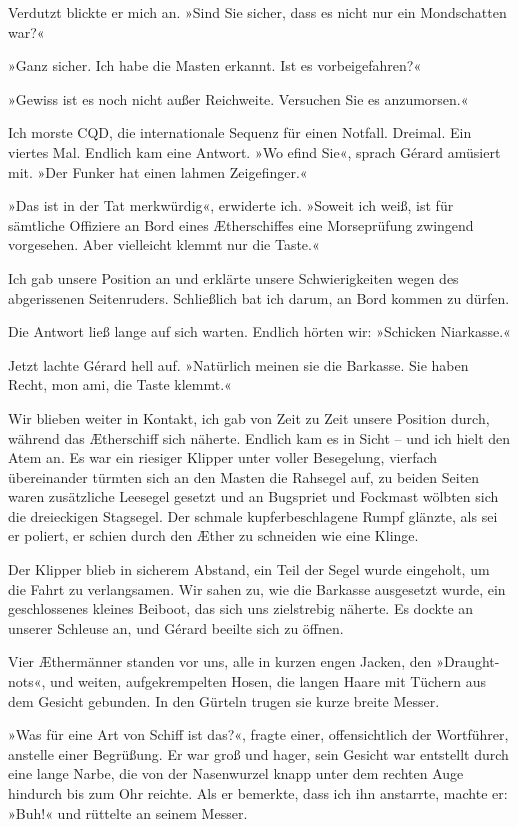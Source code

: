 Verdutzt blickte er mich an. »Sind Sie sicher, dass es nicht nur
ein Mondschatten war?«

»Ganz sicher. Ich habe die Masten erkannt. Ist es vorbeigefahren?«

»Gewiss ist es noch nicht außer Reichweite. Versuchen Sie es
anzumorsen.«

Ich morste CQD, die internationale Sequenz für einen Notfall.
Dreimal. Ein viertes Mal. Endlich kam eine Antwort. »Wo efind Sie«,
sprach Gérard amüsiert mit. »Der Funker hat einen lahmen
Zeigefinger.«

»Das ist in der Tat merkwürdig«, erwiderte ich. »Soweit ich weiß,
ist für sämtliche Offiziere an Bord eines Ætherschiffes eine
Morseprüfung zwingend vorgesehen. Aber vielleicht klemmt nur die
Taste.«

Ich gab unsere Position an und erklärte unsere Schwierigkeiten
wegen des abgerissenen Seitenruders. Schließlich bat ich darum, an
Bord kommen zu dürfen.

Die Antwort ließ lange auf sich warten. Endlich hörten wir:
»Schicken Niarkasse.«

Jetzt lachte Gérard hell auf. »Natürlich meinen sie die Barkasse.
Sie haben Recht, mon ami, die Taste klemmt.«

\bigpar

Wir blieben weiter in Kontakt, ich gab von Zeit zu Zeit unsere
Position durch, während das Ætherschiff sich näherte. Endlich kam
es in Sicht – und ich hielt den Atem an. Es war ein riesiger
Klipper unter voller Besegelung, vierfach übereinander türmten sich
an den Masten die Rahsegel auf, zu beiden Seiten waren zusätzliche
Leesegel gesetzt und an Bugspriet und Fockmast wölbten sich die
dreieckigen Stagsegel. Der schmale kupferbeschlagene Rumpf glänzte,
als sei er poliert, er schien durch den Æther zu schneiden wie eine
Klinge.

Der Klipper blieb in sicherem Abstand, ein Teil der Segel wurde
eingeholt, um die Fahrt zu verlangsamen. Wir sahen zu, wie die
Barkasse ausgesetzt wurde, ein geschlossenes kleines Beiboot, das
sich uns zielstrebig näherte. Es dockte an unserer Schleuse an, und
Gérard beeilte sich zu öffnen.

Vier Æthermänner standen vor uns, alle in kurzen engen Jacken, den
»Draught-nots«, und weiten, aufgekrempelten Hosen, die langen Haare
mit Tüchern aus dem Gesicht gebunden. In den Gürteln trugen sie
kurze breite Messer.

»Was für eine Art von Schiff ist das?«, fragte einer,
offensichtlich der Wortführer, anstelle einer Begrüßung. Er war
groß und hager, sein Gesicht war entstellt durch eine lange Narbe,
die von der Nasenwurzel knapp unter dem rechten Auge hindurch bis
zum Ohr reichte. Als er bemerkte, dass ich ihn anstarrte, machte
er: »Buh!« und rüttelte an seinem Messer.

